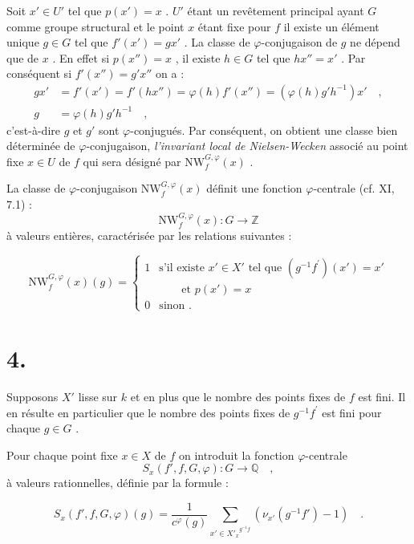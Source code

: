 \documentclass[11pt]{article}
\providecommand{\bZ}{\mathbb Z}
\providecommand{\bQ}{\mathbb Q}
\begin{document}
Soit $x' \in U'$ tel que $p(x') = x$ . $U'$ étant un revêtement principal ayant $G$ comme groupe structural et le point $x$ étant fixe pour $f$ il existe un élément unique $g \in G$ tel que $f'(x') = gx'$ . La classe de $\varphi$-conjugaison de $g$ ne dépend que de $x$ . En effet si $p(x'') = x$ , il existe $h \in G$ tel que $hx'' = x'$ . Par conséquent si $f'(x'') = g'x''$ on a :
\begin{align*}
gx' &= f'(x') = f'(hx'') = \varphi(h)f'(x'') = (\varphi(h)g'h^{-1})x' \quad , \\
g &= \varphi(h)g'h^{-1} \quad ,
\end{align*}
c'est-à-dire $g$ et $g'$ sont $\varphi$-conjugués. Par conséquent, on obtient une classe bien déterminée de $\varphi$-conjugaison, \emph{l'invariant local de Nielsen-Wecken} associé au point fixe $x \in U$ de $f$ qui sera désigné par $\mathrm{NW}_{f}^{G,\varphi}(x)$ .

La classe de $\varphi$-conjugaison $\mathrm{NW}_{f}^{G,\varphi}(x)$ définit une fonction $\varphi$-centrale (cf. XI, 7.1) :
\[
\mathrm{NW}_{f}^{G,\varphi}(x) : G \longrightarrow \bZ
\]
à valeurs entières, caractérisée par les relations suivantes :

\begin{equation}\tag{3.1}
\mathrm{NW}_{f}^{G,\varphi}(x)(g) = \begin{cases} 1 &
\text{s'il existe } x' \in X' \text{ tel que } (g^{-1}f^{\prime})(x') = x' \\ & \qquad \text{et } p(x') = x \\ 0 & \text{sinon .} \end{cases}
\end{equation}

\section*{4.}

Supposons $X'$ lisse sur $k$ et en plus que le nombre des points fixes de $f$ est fini. Il en résulte en particulier que le nombre des points fixes de $g^{-1}f^{\prime}$ est fini pour chaque $g \in G$ .

Pour chaque point fixe $x \in X$ de $f$ on introduit la fonction $\varphi$-centrale
\[
S_x(f',f,G,\varphi) : G \longrightarrow \bQ \quad ,
\]
à valeurs rationnelles, définie par la formule :

\begin{equation}\tag{4.1}
S_x(f',f,G,\varphi)(g) = \frac{1}{c^\varphi(g)} \sum_{x' \in {X'_x}^{g^{-1}f}} (\nu_{x'}(g^{-1}f') - 1) \quad .
\end{equation}
\end{document}
